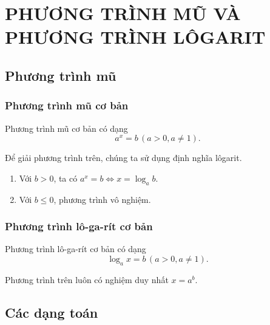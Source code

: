 \section{PHƯƠNG TRÌNH MŨ VÀ PHƯƠNG TRÌNH LÔGARIT}
\subsection{Phương trình mũ}
\subsubsection{Phương trình mũ cơ bản}
\setcounter{dn}{0}
\begin{dn} Phương trình mũ cơ bản có dạng $$a^x=b \, (a>0,a \ne 1).$$
\end{dn}
\begin{note} Để giải phương trình trên, chúng ta sử dụng định nghĩa lôgarit.
\begin{enumerate}
	\item Với $ b>0 $, ta có $ a^x=b \Leftrightarrow x=\log_a b $.
	\item Với $ b \le 0 $, phương trình vô nghiệm.
\end{enumerate}
\end{note}

\subsubsection{Phương trình lô-ga-rít cơ bản}
\begin{dn} Phương trình lô-ga-rít cơ bản có dạng $$\log_ax=b \, (a>0,a \ne 1).$$
\end{dn}
\begin{note} Phương trình trên luôn có nghiệm duy nhất $x=a^b$.
\end{note}

\subsection{Các dạng toán}
